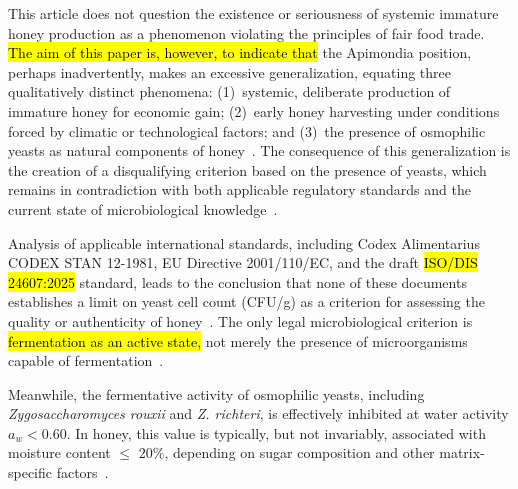 \documentclass[foods,review,accept,pdftex,moreauthors]{Definitions/mdpi}
\begin{document}
This article does not question the existence or seriousness of
systemic immature honey production as a phenomenon violating the
principles of fair food trade. \hl{The aim of this paper is,
however, to indicate that} %
 the Apimondia position, perhaps
inadvertently, makes an excessive generalization, equating three
qualitatively distinct phenomena:
(1)~systemic, deliberate production of immature honey for economic
gain; (2)~early honey harvesting under conditions forced by climatic
or technological factors; and (3)~the presence of osmophilic yeasts
as natural components of honey~\cite{garcia2025,munitis1976}.
The consequence of this generalization is the creation of a
disqualifying criterion based on the presence of yeasts, which
remains in contradiction with both applicable regulatory standards
and the current state of microbiological
knowledge~\cite{codex_stan12, rodriguezmachado2024}.

Analysis of applicable international standards, including Codex
Alimentarius CODEX STAN 12-1981, EU Directive 2001/110/EC, and the
draft \hl{ISO/DIS 24607:2025}  %
standard, leads to the conclusion that
none of these documents establishes a limit on yeast cell count
(CFU/g) as a criterion for assessing the quality or authenticity of
honey~\cite{codex_stan12}.
The only legal microbiological criterion is  \hl{fermentation as an
active state,} %
 not merely the presence of microorganisms capable of
fermentation~\cite{codex_stan12}. 

{
    Meanwhile, the fermentative activity of osmophilic yeasts, including \textit{Zygosaccharomyces rouxii} and \textit{Z. richteri}, is effectively inhibited at water activity $a_w < 0.60$. In honey, this value is typically, but not invariably, associated with moisture content $\leq $ $20\%$, depending on sugar composition and other matrix-specific factors~\cite{zamora2006,ruegg1981}.
}
\end{document}
